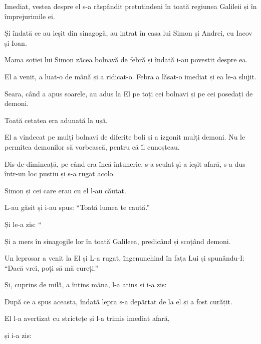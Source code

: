 {Imediat, vestea despre el s-a răspândit pretutindeni în toată regiunea Galileii și în împrejurimile ei.


\par }{\PP {}Și îndată ce au ieșit din sinagogă, au intrat în casa lui Simon și Andrei, cu Iacov și Ioan.

Mama soției lui Simon zăcea bolnavă de febră și îndată i-au povestit despre ea.

El a venit, a luat-o de mână și a ridicat-o. Febra a lăsat-o imediat și ea le-a slujit.


\par }{\PP {}Seara, când a apus soarele, au adus la El pe toți cei bolnavi și pe cei posedați de demoni.

Toată cetatea era adunată la ușă.

El a vindecat pe mulți bolnavi de diferite boli și a izgonit mulți demoni. Nu le permitea demonilor să vorbească, pentru că îl cunoșteau.


\par }{\PP {}Dis-de-dimineață, pe când era încă întuneric, s-a sculat și a ieșit afară, s-a dus într-un loc pustiu și s-a rugat acolo.

Simon și cei care erau cu el l-au căutat.

L-au găsit și i-au spus: “Toată lumea te caută.”


\par }{\PP {}Și le-a zis: “{}

Și a mers în sinagogile lor în toată Galileea, predicând și scoțând demoni.


\par }{\PP {}Un leprosar a venit la El și L-a rugat, îngenunchind în fața Lui și spunându-I: “Dacă vrei, poți să mă cureți.”


\par }{\PP {}Și, cuprins de milă, a întins mâna, l-a atins și i-a zis:
{}

După ce a spus aceasta, îndată lepra s-a depărtat de la el și a fost curățit.

El l-a avertizat cu strictețe și l-a trimis imediat afară,

și i-a zis:
{}


}
